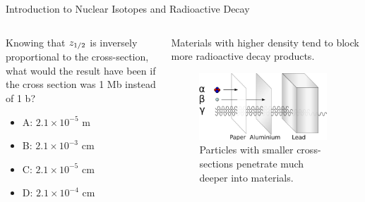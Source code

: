 \documentclass{beamer}
\begin{document}
\begin{frame}{Introduction to Nuclear Isotopes and Radioactive Decay}
\begin{columns}[T]
\begin{column}{0.6\textwidth}
\small
Knowing that $z_{\rm 1/2}$ is inversely proportional to the cross-section, what would the result have been if the cross section was 1 Mb instead of 1 b?
\begin{itemize}
\item A: $2.1 \times 10^{-5}$ m
\item B: $2.1 \times 10^{-3}$ cm
\item C: $2.1 \times 10^{-5}$ cm
\item D: $2.1 \times 10^{-4}$ cm
\end{itemize}
\end{column}
\begin{column}{0.4\textwidth}
\footnotesize
Materials with higher density tend to block more radioactive decay products.
\begin{figure}
\centering
\includegraphics[width=0.95\textwidth]{figures/radioactivity.png}
\caption{\label{fig:radio10} Particles with smaller cross-sections penetrate much deeper into materials.}
\end{figure}
\end{column}
\end{columns}
\end{frame}
\end{document}
